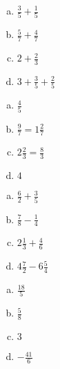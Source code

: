     \begin{multicols}{2}
        \begin{tehtava}
            \begin{enumerate}[a)]
        	\item $\frac{3}{5} + \frac{1}{5}$
        	\item $\frac{5}{7} + \frac{4}{7}$
        	\item $2 + \frac{2}{3}$
        	\item$3 + \frac{3}{5} + \frac{2}{5}$   
            \end{enumerate}
            \begin{vastaus}
        		\begin{enumerate}[(a)]
        			\item $\frac{4}{5}$
        			\item $\frac{9}{7} = 1 \frac{2}{7}$
        			\item $2 \frac{2}{3} = \frac{8}{3}$
        			\item $4$
        		\end{enumerate}
            \end{vastaus}
        \end{tehtava}
        
        \begin{tehtava}
        
        \begin{enumerate}[a)]
        	\item $\frac{6}{2} + \frac{3}{5}$
        	\item $\frac{7}{8} - \frac{1}{4}$
        	\item $2 \frac{1}{3} + \frac{4}{6}$
        	\item $4 \frac{7}{2} - 6 \frac{5}{4}$
        \end{enumerate}
            \begin{vastaus}		
        		\begin{enumerate}[a)]
        			\item $\frac{18}{5}$
        			\item $\frac{5}{8}$
        			\item $3$
        			\item $-\frac{41}{6}$ 
        		\end{enumerate}
            \end{vastaus}
        \end{tehtava}
        
        \begin{tehtava}
        

\end{tehtava}
\end{multicols}

